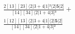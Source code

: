 \documentclass[varwidth, border=5pt]{standalone}
\begin{document}
\begin{my}
$\begin{gathered}
\scriptscriptstyle\frac{2[13][23]⟨2|3+4|1]²⟨2|𝟓|2]}{[14][34]⟨2|1+4|3]³} +\\
\scriptscriptstyle\frac{1[12][13]⟨2|3+4|1]⟨2|𝟓|2]}{[14][34]⟨2|1+4|3]²} \phantom{+}
\end{gathered}$
\end{my}
\end{document}
